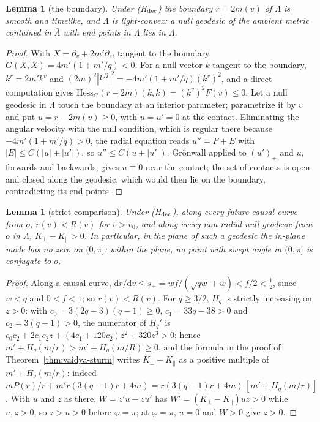 \documentclass[aip,jmp,amsmath,amssymb,reprint]{revtex4-2}
\newcommand{\dd}{\mathrm{d}}
\theoremstyle{plain}
\newtheorem{lemma}[proposition]{Lemma}
\theoremstyle{definition}
\begin{document}
\begin{lemma}[the boundary]\label{lem:vaidya-dec-boundary}
Under (H$_{\rm dec}$) the boundary $r=2m(v)$ of $\Lambda$ is smooth and timelike, and $\Lambda$ is light-convex: a
null geodesic of the ambient metric contained in $\bar\Lambda$ with end points in $\Lambda$ lies in $\Lambda$.
\end{lemma}

\begin{proof}
With $X=\partial_v+2m'\partial_r$, tangent to the boundary, $G(X,X)=4m'(1+m'/q)<0$. For a null vector $k$
tangent to the boundary, $k^r=2m'k^v$ and $(2m)^2|k^\Omega|^2=-4m'(1+m'/q)(k^v)^2$, and a direct
computation gives $\mathrm{Hess}_G(r-2m)(k,k)=(k^v)^2F(v)\le0$. Let a null geodesic in $\bar\Lambda$ touch the
boundary at an interior parameter; parametrize it by $v$ and put $u=r-2m(v)\ge0$, with $u=u'=0$ at
the contact. Eliminating the angular velocity with the null condition, which is regular there
because $-4m'(1+m'/q)>0$, the radial equation reads $u''=F+E$ with $|E|\le C(|u|+|u'|)$, so
$u''\le C(u+|u'|)$. Gr\"onwall applied to $(u')_+$ and $u$, forwards and backwards, gives $u\equiv0$
near the contact; the set of contacts is open and closed along the geodesic, which would then lie
on the boundary, contradicting its end points.
\end{proof}

\begin{lemma}[strict comparison]\label{lem:vaidya-dec-sturm}
Under (H$_{\rm dec}$), along every future causal curve from $o$, $r(v)<R(v)$ for $v>v_0$, and along every
non-radial null geodesic from $o$ in $\Lambda$, $K_\perp-K_\parallel>0$. In particular, in the plane of such a
geodesic the in-plane mode has no zero on $(0,\pi]$: within the plane, no point with swept angle
in $(0,\pi]$ is conjugate to $o$.
\end{lemma}

\begin{proof}
Along a causal curve, $\dd r/\dd v\le s_+=wf/(\sqrt{qw}+w)<f/2<\frac12$, since $w<q$ and $0<f<1$; so
$r(v)<R(v)$. For $q\ge3/2$, $H_q$ is strictly increasing on $z>0$: with $c_0=3(2q-3)(q-1)\ge0$, $c_1=33q-38>0$ and
$c_2=3(q-1)>0$, the numerator of $H_q'$ is $c_0c_2+2c_1c_2z+(4c_1+120c_2)z^2+320z^3>0$; hence
$m'+H_q(m/r)>m'+H_q(m/R)\ge0$, and the formula in the proof of Theorem~\ref{thm:vaidya-sturm}
writes $K_\perp-K_\parallel$ as a positive multiple of $m'+H_q(m/r)$: indeed
$mP(r)/r+m'r(3(q-1)r+4m)=r(3(q-1)r+4m)\,[m'+H_q(m/r)]$. With $u$ and $z$ as there, $W=z'u-zu'$ has
$W'=(K_\perp-K_\parallel)uz>0$ while $u,z>0$, so $z>u>0$ before $\varphi=\pi$; at $\varphi=\pi$, $u=0$ and $W>0$
give $z>0$.
\end{proof}
\end{document}
